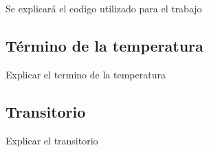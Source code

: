 
Se explicar\'a el codigo utilizado para el trabajo

	\subsection{T\'ermino de la temperatura}
		\label{Mdl:Code:Temp}

		Explicar el termino de la temperatura

	\subsection{Transitorio}
		\label{Mdl:Code:Trans}

		Explicar el transitorio
